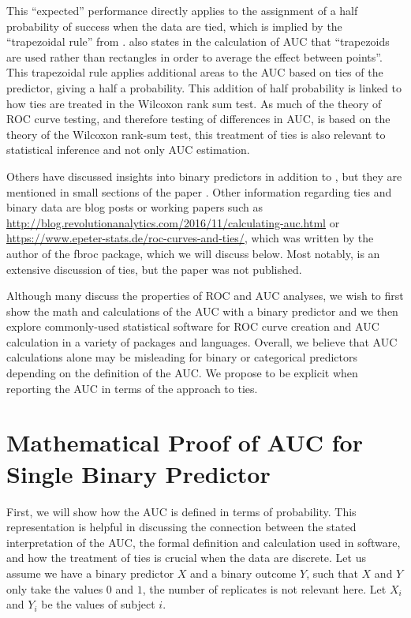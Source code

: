 \documentclass[12pt]{article}
\newcommand{\pkg}[1]{{\fontseries{b}\selectfont #1}}
\begin{document}
This ``expected'' performance directly applies to the assignment of a
half probability of success when the data are tied, which is implied by
the ``trapezoidal rule'' from \citet{hanley1982meaning}.
\citet{fawcett2006introduction} also states in the calculation of AUC
that ``trapezoids are used rather than rectangles in order to average
the effect between points''. This trapezoidal rule applies additional
areas to the AUC based on ties of the predictor, giving a half a
probability. This addition of half probability is linked to how ties are
treated in the Wilcoxon rank sum test. As much of the theory of ROC
curve testing, and therefore testing of differences in AUC, is based on
the theory of the Wilcoxon rank-sum test, this treatment of ties is also
relevant to statistical inference and not only AUC estimation.

Others have discussed insights into binary predictors in addition to
\citet{fawcett2006introduction}, but they are mentioned in small
sections of the paper \citep{saito2015precision, pepe2009estimation}.
Other information regarding ties and binary data are blog posts or
working papers such as
\url{http://blog.revolutionanalytics.com/2016/11/calculating-auc.html}
or \url{https://www.epeter-stats.de/roc-curves-and-ties/}, which was
written by the author of the \pkg{fbroc} \citep{fbroc} package, which we
will discuss below. Most notably, \citet{hsu2014inference} is an
extensive discussion of ties, but the paper was not published.

Although many discuss the properties of ROC and AUC analyses, we wish to
first show the math and calculations of the AUC with a binary predictor
and we then explore commonly-used statistical software for ROC curve
creation and AUC calculation in a variety of packages and languages.
Overall, we believe that AUC calculations alone may be misleading for
binary or categorical predictors depending on the definition of the AUC.
We propose to be explicit when reporting the AUC in terms of the
approach to ties.

\hypertarget{mathematical-proof-of-auc-for-single-binary-predictor}{%
\section{Mathematical Proof of AUC for Single Binary
Predictor}\label{mathematical-proof-of-auc-for-single-binary-predictor}}

First, we will show how the AUC is defined in terms of probability. This
representation is helpful in discussing the connection between the
stated interpretation of the AUC, the formal definition and calculation
used in software, and how the treatment of ties is crucial when the data
are discrete. Let us assume we have a binary predictor \(X\) and a
binary outcome \(Y\), such that \(X\) and \(Y\) only take the values
\(0\) and \(1\), the number of replicates is not relevant here. Let
\(X_{i}\) and \(Y_{i}\) be the values of subject \(i\).
\end{document}
